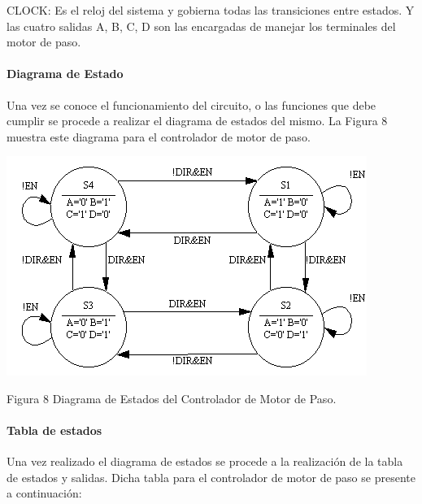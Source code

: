 CLOCK: Es el reloj del sistema y gobierna todas las transiciones entre estados. 
Y las cuatro salidas A, B, C, D son las encargadas de manejar los terminales del motor de paso.

\paragraph[Diagrama de Estado]{ Diagrama de Estado}

Una vez se conoce el funcionamiento del circuito, o las funciones que debe cumplir se procede a realizar el diagrama de estados del mismo. La
Figura 8 muestra este diagrama para el controlador de motor de paso.

{\centering \includegraphics[width=11.719cm,height=7.142cm]{./images/FSM-img8.png} \par}
Figura 8 Diagrama de Estados del Controlador de Motor de Paso.

\paragraph[Tabla de estados]{ Tabla de estados}

Una vez realizado el diagrama de estados se procede a la realización de la tabla de estados y salidas. Dicha tabla para el controlador de motor
de paso se presente a continuación:

